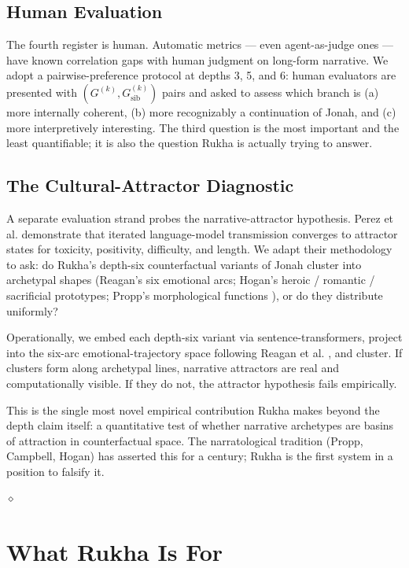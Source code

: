 \documentclass[11pt]{article}
\theoremstyle{rukha}
\newcommand{\diamondrule}{%
  \begin{center}\vspace{0.6em}%
  {\scriptsize $\diamond$}\vspace{0.6em}\end{center}}
\begin{document}
\subsection{Human Evaluation}

The fourth register is human. Automatic metrics --- even agent-as-judge
ones --- have known correlation gaps with human judgment on long-form
narrative. We adopt a pairwise-preference protocol at depths 3, 5, and 6:
human evaluators are presented with $(G^{(k)}, G^{(k)}_{\text{sib}})$
pairs and asked to assess which branch is (a) more internally coherent,
(b) more recognizably a continuation of Jonah, and (c) more
interpretively interesting. The third question is the most important
and the least quantifiable; it is also the question Rukha is actually
trying to answer.

\subsection{The Cultural-Attractor Diagnostic}

A separate evaluation strand probes the narrative-attractor hypothesis.
Perez et al. \cite{perezattractors} demonstrate that iterated
language-model transmission converges to attractor states for
toxicity, positivity, difficulty, and length. We adapt their
methodology to ask: do Rukha's depth-six counterfactual variants of
Jonah cluster into archetypal shapes (Reagan's six emotional arcs;
Hogan's heroic / romantic / sacrificial prototypes; Propp's morphological
functions \cite{proppmorphology}), or do they distribute uniformly?

Operationally, we embed each depth-six variant via sentence-transformers,
project into the six-arc emotional-trajectory space following Reagan et
al. \cite{reagansixarcs}, and cluster. If clusters form along
archetypal lines, narrative attractors are real and computationally
visible. If they do not, the attractor hypothesis fails empirically.

This is the single most novel empirical contribution Rukha makes
beyond the depth claim itself: a quantitative test of whether narrative
archetypes are basins of attraction in counterfactual space. The
narratological tradition (Propp, Campbell, Hogan) has asserted this for
a century; Rukha is the first system in a position to falsify it.

\diamondrule

\section{What Rukha Is For}
\end{document}
